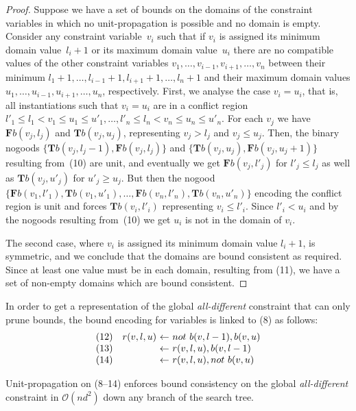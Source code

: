 \documentclass{tlp}
\newcommand{\tass}[1]{\mathbf{T}#1}
\newcommand{\fass}[1]{\mathbf{F}#1}
\newcommand{\dneg}{not\ }
\begin{document}
\begin{proof}
Suppose we have a set of bounds on the domains of the constraint variables in which no unit-propagation is possible and no domain is empty.
Consider any constraint variable~$v_i$ such that if $v_i$ is assigned its minimum domain value~$l_i+1$ or its maximum domain value~$u_i$ there are no compatible values of the other constraint variables $v_1,\dots, v_{i-1}, v_{i+1}, \dots, v_n$ between their minimum $l_1+1, \dots, l_{i-1}+1, l_{i+1}+1, \dots, l_n+1$ and their maximum domain values $u_1, \dots, u_{i-1}, u_{i+1}, \dots, u_n$, respectively. First, we analyse the case $v_i = u_i$, that is, all instantiations such that $v_i = u_i$ are in a conflict region $l'_1 \leq l_1 < v_1 \leq u_1 \leq u'_1, \dots, l'_n \leq l_n < v_n \leq u_n \leq u'_n$. For each $v_j$ we have $\fass{b(v_j,l_j)}$ and $\tass{b(v_j,u_j)}$, representing $v_j > l_j$ and $v_j \leq u_j$.
Then, the binary nogoods $\{\tass{b(v_j,l_j-1)}, \fass{b(v_j,l_j)}\}$ and $\{\tass{b(v_j,u_j)}, \fass{b(v_j,u_j+1)}\}$ resulting from~(10) are unit, and eventually we get $\fass{b(v_j,l'_j)}$ for $l'_j \leq l_j$ as well as $\tass{b(v_j,u'_j)}$ for $u'_j \geq u_j$. But then the nogood $\{ \fass{b(v_1, l'_1)}, \tass{b(v_1, u'_1)}, \dots, \fass{b(v_n, l'_n)}, \tass{b(v_n, u'_n)} \}$ encoding the conflict region is unit and forces $\tass{b(v_i,l'_i)}$ representing $v_i \leq l'_i$.
Since $l'_i < u_i$ and by the nogoods resulting from~(10) we get $u_i$ is not in the domain of $v_i$.

The second case, where $v_i$ is assigned its minimum domain value $l_i+1$, is symmetric, and we conclude that the domains are bound consistent as required.
Since at least one value must be in each domain, resulting from (11), we have a set of non-empty domains which are bound consistent.
\end{proof}
In order to get a representation of the global \emph{all-different} constraint that can only prune bounds, the bound encoding for variables is linked to (8) as follows:
\[
\begin{array}{cr@{\ \leftarrow\ }l}
(12) & r(v, l, u) & \dneg b(v, l-1), b(v, u) \\
(13) & & r(v, l, u), b(v, l-1) \\
(14) & & r(v, l, u), \dneg b(v, u)
\end{array}
\]
\begin{corollary}
Unit-propagation on (8--14) enforces bound consistency on the global \emph{all-different} constraint in $\mathcal{O}(nd^2)$ down any branch of the search tree.
\end{corollary}
\end{document}
